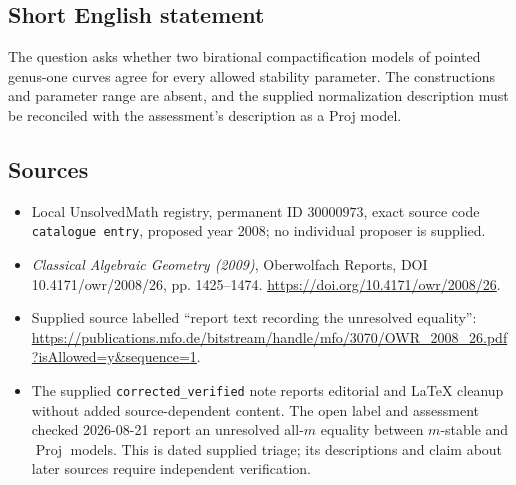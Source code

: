 \documentclass[11pt]{article}
\begin{document}
\subsection{Short English statement}
The question asks whether two birational compactification models of pointed genus-one curves agree for every allowed stability parameter. The constructions and parameter range are absent, and the supplied normalization description must be reconciled with the assessment's description as a Proj model.
\subsection{Sources}
\begin{itemize}
\item Local UnsolvedMath registry, permanent ID \(30000973\), exact source code \texttt{catalogue entry}, proposed year 2008; no individual proposer is supplied.
\item \emph{Classical Algebraic Geometry (2009)}, Oberwolfach Reports, DOI 10.4171/owr/2008/26, pp. 1425--1474. \url{https://doi.org/10.4171/owr/2008/26}.
\item Supplied source labelled ``report text recording the unresolved equality'': \url{https://publications.mfo.de/bitstream/handle/mfo/3070/OWR_2008_26.pdf?isAllowed=y&sequence=1}.
\item The supplied \texttt{corrected\_verified} note reports editorial and LaTeX cleanup without added source-dependent content. The open label and assessment checked 2026-08-21 report an unresolved all-\(m\) equality between \(m\)-stable and \(\operatorname{Proj}\) models. This is dated supplied triage; its descriptions and claim about later sources require independent verification.
\end{itemize}
\end{document}
